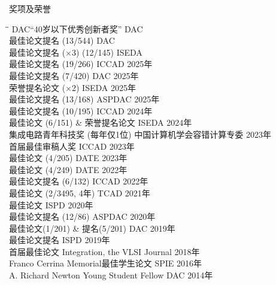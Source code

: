 
\begin{rSection}{奖项及荣誉}
\begin{tabbing}
\hspace{3.3in}\= \hspace{2.7in}\= \kill
DAC“40岁以下优秀创新者奖” \> DAC  \\
最佳论文提名 (13/544) \> DAC  \\
最佳论文提名 ($\times$3) (12/145) \> ISEDA  \\
最佳论文提名 (19/266) \> ICCAD \> { 2025年 } \\
最佳论文提名 (7/420) \> DAC \> { 2025年 } \\
荣誉提名论文 ($\times$2) \> ISEDA \> { 2025年 } \\
最佳论文提名 (13/168) \> ASPDAC \> { 2025年 } \\
最佳论文提名 (10/195) \> ICCAD \> { 2024年 } \\
最佳论文 (6/151) \& 荣誉提名论文 \> ISEDA \> { 2024年 } \\
集成电路青年科技奖 (每年仅1位) \> 中国计算机学会容错计算专委 \> { 2023年 } \\
首届最佳审稿人奖 \> ICCAD \> { 2023年 } \\
最佳论文 (4/205) \> DATE \> { 2023年 } \\
最佳论文 (4/249) \> DATE \> { 2022年 } \\
最佳论文提名 (6/132) \> ICCAD \> { 2022年 } \\
最佳论文 (2/3495, 4年) \> TCAD \> { 2021年 } \\
最佳论文 \> ISPD \> { 2020年 } \\
最佳论文提名 (12/86) \> ASPDAC \> { 2020年 } \\
最佳论文(1/201) \& 提名(5/201) \> DAC \> { 2019年 } \\
最佳论文提名 \> ISPD \> { 2019年 } \\
首届最佳论文 \> Integration, the VLSI Journal \> { 2018年 } \\
Franco Cerrina Memorial最佳学生论文 \> SPIE \> { 2016年 } \\
A. Richard Newton Young Student Fellow \> DAC \> { 2014年 } \\
\end{tabbing}
\end{rSection}

